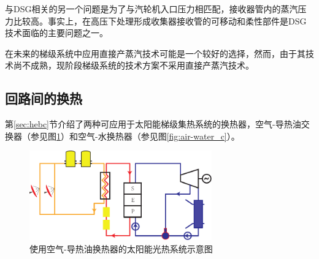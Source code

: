 与DSG相关的另一个问题是为了与汽轮机入口压力相匹配，接收器管内的蒸汽压力比较高。事实上，在高压下处理形成收集器接收管的可移动和柔性部件是DSG技术面临的主要问题之一。

在未来的梯级系统中应用直接产蒸汽技术可能是一个较好的选择，然而，由于其技术尚不成熟，现阶段梯级系统的技术方案不采用直接产蒸汽技术。

\subsection{回路间的换热}

第\ref{sec:hebc}节介绍了两种可应用于太阳能梯级集热系统的换热器，空气-导热油交换器（参见图\ref{fig:air-oil_c}）和空气-水换热器（参见图\ref{fig:air-water_c}）。

\begin{figure}[h]
\centering 
\includegraphics[width=0.7\textwidth]{fig/air-oil}
\caption{使用空气-导热油换热器的太阳能光热系统示意图}\label{fig:air-oil_c}
\end{figure}

